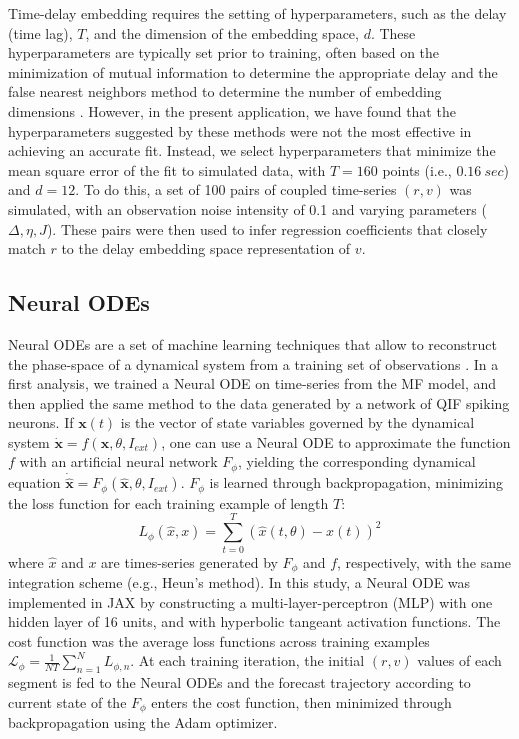 \documentclass[12pt]{article}
\begin{document}
Time-delay embedding requires the setting of hyperparameters, such as the delay (time lag), $T$, and  the dimension of the embedding space, $d$. These hyperparameters are typically set prior to training, often based on the minimization of mutual information to determine the appropriate delay and the false nearest neighbors method to determine the number of embedding dimensions \citep{Kennel1992, Tan2023}. However, in the present application, we have found that the hyperparameters suggested by these methods were not the most effective in achieving an accurate fit. Instead, we select hyperparameters that minimize the mean square error of the fit to simulated data, with $T=160$ points (i.e., $0.16~sec$) and $d=12$. To do this, a set of 100 pairs of coupled time-series $(r, v)$ was simulated, with an observation noise intensity of 0.1 and varying parameters ($\Delta, \eta, J$). These pairs were then used to infer regression coefficients that closely match $r$ to the delay embedding space representation of $v$.



\subsection{Neural ODEs}

Neural ODEs are a set of machine learning techniques that allow to reconstruct the phase-space of a dynamical system from a training set of observations \citep{Chen2018}. In a first analysis, we trained a Neural ODE on time-series from the MF model, and then applied the same method to the data generated by a network of QIF spiking neurons. If $\textbf{x}(t)$ is the vector of state variables governed by the dynamical system $\dot{\textbf{x}} = f(\textbf{x}, \theta,I_{ext})$, one can use a Neural ODE to approximate the function $f$ with an artificial neural network $F_{\phi}$, yielding the corresponding dynamical equation $\dot{\hat{\textbf{x}}} = F_{\phi}(\hat{\textbf{x}},\theta,I_{ext})$. $F_{\phi}$ is learned through backpropagation, minimizing the loss function for each training example of length $T$: 
\[L_{\phi}(\hat{x},x)={\sum_{t=0}^{T}(\hat{x}(t, \theta)-x(t))^2}\]
where $\hat{x}$ and $x$ are times-series generated by $F_{\phi}$ and $f$,  respectively, with the same integration scheme (e.g., Heun's method). In this study, a Neural ODE was implemented in JAX \citep{jax2018github} by constructing a multi-layer-perceptron (MLP) with one hidden layer of 16 units, and with hyperbolic tangeant activation functions. The cost function was the average loss functions across training examples $\mathcal{L_{\phi}}=\frac{1}{N T}\sum_{n=1}^{N}L_{\phi,n}$. 
At each training iteration, the initial $(r, v)$ values of each segment is fed to the Neural ODEs and the forecast trajectory according to current state of the $F_{\phi}$ enters the cost function, then minimized through backpropagation using the Adam optimizer. 
\end{document}
